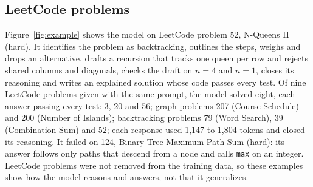 \documentclass[sigconf,nonacm,balance=false]{acmart}
\begin{document}
\subsection{LeetCode problems}

Figure~\ref{fig:example} shows the model on LeetCode problem 52, N-Queens II (hard). It identifies the problem as
backtracking, outlines the steps, weighs and drops an alternative, drafts a recursion that tracks one queen per row and
rejects shared columns and diagonals, checks the draft on $n = 4$ and $n = 1$, closes its reasoning and writes an
explained solution whose code passes every test. Of nine LeetCode problems given with the same prompt, the model
solved eight, each answer passing every test: 3, 20 and 56; graph problems 207 (Course Schedule) and 200 (Number of
Islands); backtracking problems 79 (Word Search), 39 (Combination Sum) and 52; each response used 1,147 to 1,804
tokens and closed its reasoning. It failed on 124, Binary Tree Maximum Path Sum (hard): its answer follows only paths
that descend from a node and calls \texttt{max} on an integer. LeetCode problems were not removed from the training
data, so these examples show how the model reasons and answers, not that it generalizes.
\end{document}

